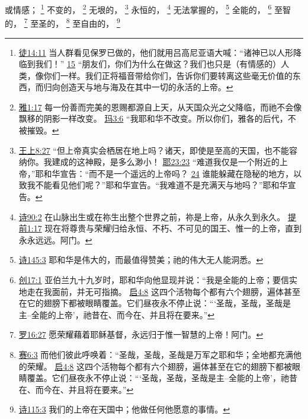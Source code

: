 \documentclass[12pt, a4paper, oneside]{ctexart}
\begin{document}
	或情感；
	\footnote {
		\href{https://biblehub.com/acts/14-11.htm}{徒14:11} 当人群看见保罗已做的，他们就用吕高尼亚语大喊：“诸神已以人形降临到我们！”
		\href{https://biblehub.com/acts/14-15.htm}{15} “朋友们，你们为什么在做这？我们也只是（有情感的）人类，像你们一样。我们正将福音带给你们，告诉你们要转离这些毫无价值的东西，而归向创造天与地与海及在其中一切的永活的上帝。
	}
	不变的，
	\footnote {
		\href{https://biblehub.com/james/1-17.htm}{雅1:17} 每一份善而完美的恩赐都源自上天，从天国众光之父降临，而祂不会像飘移的阴影一样改变。
		\href{https://biblehub.com/malachi/3-6.htm}{玛3:6} “我耶和华不改变。所以你们，雅各的后代，不被摧毁。
	}
	无垠的，
	\footnote {
		\href{https://biblehub.com/1_kings/8-27.htm}{王上8:27} “但上帝真实会栖居在地上吗？诸天，即使是至高的天国，也不能容纳你。我建成的这神殿，是多么渺小！
		\href{https://biblehub.com/jeremiah/23-23.htm}{耶23:23} “难道我仅是一个附近的上帝，”耶和华宣告：“而不是一个遥远的上帝吗？
		\href{https://biblehub.com/jeremiah/23-24.htm}{24} 谁能躲藏在隐秘的地方，以致我不能看见他们呢？”耶和华宣告。“我难道不是充满天与地吗？”耶和华宣告。
	}
	永恒的，
	\footnote {
		\href{https://biblehub.com/psalms/90-2.htm}{诗90:2} 在山脉出生或在祢生出整个世界之前，祢是上帝，从永久到永久。
		\href{https://biblehub.com/1_timothy/1-17.htm}{提前1:17} 现在将尊贵与荣耀归给永恒、不朽、不可见的国王、惟一的上帝，直到永永远远。阿门。
	}
	无法掌握的，
	\footnote {
		\href{https://biblehub.com/psalms/145-3.htm}{诗145:3} 耶和华是伟大的，而最值得赞美；祂的伟大无人能洞悉。
	}
	全能的，
	\footnote {
		\href{https://biblehub.com/genesis/17-1.htm}{创17:1} 亚伯兰九十九岁时，耶和华向他显现并说：“我是全能的上帝；要信实地走在我面前，并无可指摘。
		\href{https://biblehub.com/revelation/4-8.htm}{启4:8} 这四个活物每个都有六个翅膀，遍体甚至在它的翅膀下都被眼睛覆盖。它们昼夜永不停止说：“‘圣哉，圣哉，圣哉是主--全能的上帝’，祂昔在、而今在、并且将在要来。”
	}
	至智的，
	\footnote {
		\href{https://biblehub.com/romans/16-27.htm}{罗16:27} 愿荣耀藉着耶稣基督，永远归于惟一智慧的上帝！阿门。
	}
	至圣的，
	\footnote {
		\href{https://biblehub.com/isaiah/6-3.htm}{赛6:3} 而他们彼此呼唤着：“圣哉，圣哉，圣哉是万军之耶和华；全地都充满他的荣耀。
		\href{https://biblehub.com/revelation/4-8.htm}{启4:8} 这四个活物每个都有六个翅膀，遍体甚至在它的翅膀下都被眼睛覆盖。它们昼夜永不停止说：“‘圣哉，圣哉，圣哉是主--全能的上帝’，祂昔在、而今在、并且将在要来。”
	}
	至自由的，
	\footnote {
		\href{https://biblehub.com/psalms/115-3.htm}{诗115:3} 我们的上帝在天国中；他做任何他愿意的事情。
	}
\end{document}
